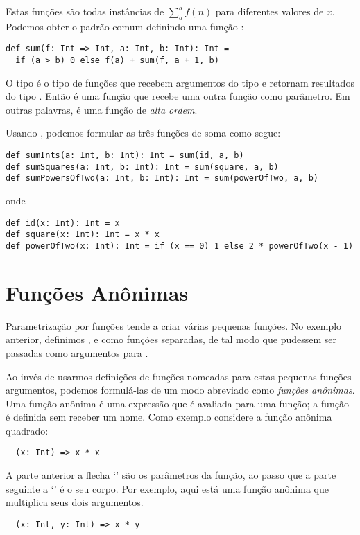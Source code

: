 Estas fun\c{c}\~{o}es s\~{a}o todas inst\^{a}ncias de \(\sum^b_a f(n)\) para diferentes valores de $x$.
Podemos obter o padr\~{a}o comum definindo uma fun\c{c}\~{a}o : 
\begin{lstlisting}
def sum(f: Int => Int, a: Int, b: Int): Int =
  if (a > b) 0 else f(a) + sum(f, a + 1, b)
\end{lstlisting}

O tipo  \'{e} o tipo de fun\c{c}\~{o}es que recebem argumentos do tipo
 e retornam resultados do tipo . Ent\~{a}o  \'{e} uma 
fun\c{c}\~{a}o que recebe uma outra fun\c{c}\~{a}o como par\^{a}metro. Em outras palavras, 
\'{e} uma fun\c{c}\~{a}o de {\em alta ordem}.     

Usando , podemos formular as tr\^{e}s fun\c{c}\~{o}es de soma como segue: 
\begin{lstlisting}
def sumInts(a: Int, b: Int): Int = sum(id, a, b)
def sumSquares(a: Int, b: Int): Int = sum(square, a, b)
def sumPowersOfTwo(a: Int, b: Int): Int = sum(powerOfTwo, a, b)
\end{lstlisting}
onde 
\begin{lstlisting}
def id(x: Int): Int = x
def square(x: Int): Int = x * x
def powerOfTwo(x: Int): Int = if (x == 0) 1 else 2 * powerOfTwo(x - 1)
\end{lstlisting}

\section{Fun\c{c}\~{o}es An\^{o}nimas}
Parametriza\c{c}\~{a}o por fun\c{c}\~{o}es tende a criar v\'{a}rias pequenas fun\c{c}\~{o}es. No exemplo 
anterior, definimos ,  e  como fun\c{c}\~{o}es 
separadas, de tal modo que pudessem ser passadas como argumentos para .    


Ao inv\'{e}s de usarmos defini\c{c}\~{o}es de fun\c{c}\~{o}es nomeadas para estas pequenas fun\c{c}\~{o}es 
argumentos, podemos formul\'{a}-las de um modo abreviado como {\em fun\c{c}\~{o}es an\^{o}nimas}.
Uma fun\c{c}\~{a}o an\^{o}nima \'{e} uma express\~{a}o que \'{e} avaliada para uma fun\c{c}\~{a}o; a fun\c{c}\~{a}o \'{e} 
definida sem receber um nome. Como exemplo considere a fun\c{c}\~{a}o an\^{o}nima quadrado:
\begin{lstlisting}
  (x: Int) => x * x
\end{lstlisting}

A parte anterior a flecha `\code{=>}' s\~{a}o os par\^{a}metros da fun\c{c}\~{a}o, ao passo que a parte
seguinte a `\code{=>}' \'{e} o seu corpo.
Por exemplo, aqui est\'{a} uma fun\c{c}\~{a}o an\^{o}nima que multiplica seus dois argumentos.
\begin{lstlisting}
  (x: Int, y: Int) => x * y
\end{lstlisting}

